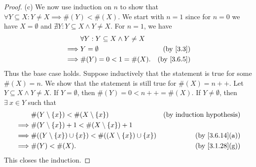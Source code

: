 \begin{proof}{(c)}
  We now use induction on \(n\) to show that \(\forall Y \subseteq X : Y \neq X \implies \#(Y) < \#(X)\).
  We start with \(n = 1\) since for \(n = 0\) we have \(X = \emptyset\) and \(\nexists Y : Y \subseteq X \land Y \neq X\).
  For \(n = 1\), we have
  \begin{align*}
             & \forall Y : Y \subseteq X \land Y \neq X                            \\
    \implies & Y = \emptyset                            & \text{(by \cref{3.3})}   \\
    \implies & \#(Y) = 0 < 1 = \#(X).                   & \text{(by \cref{3.6.5})}
  \end{align*}
  Thus the base case holds.
  Suppose inductively that the statement is true for some \(\#(X) = n\).
  We show that the statement is still true for \(\#(X) = n++\).
  Let \(Y \subseteq X \land Y \neq X\).
  If \(Y = \emptyset\), then \(\#(Y) = 0 < n++ = \#(X)\).
  If \(Y \neq \emptyset\), then \(\exists\ x \in Y\) such that
  \begin{align*}
             & \#(Y \setminus \{x\}) < \#(X \setminus \{x\})                           & \text{(by induction hypothesis)} \\
    \implies & \#(Y \setminus \{x\}) + 1 < \#(X \setminus \{x\}) + 1                                                      \\
    \implies & \#((Y \setminus \{x\}) \cup \{x\}) < \#((X \setminus \{x\}) \cup \{x\}) & \text{(by \cref{3.6.14}(a))}     \\
    \implies & \#(Y) < \#(X).                                                          & \text{(by \cref{3.1.28}(g))}
  \end{align*}
  This closes the induction.
\end{proof}

